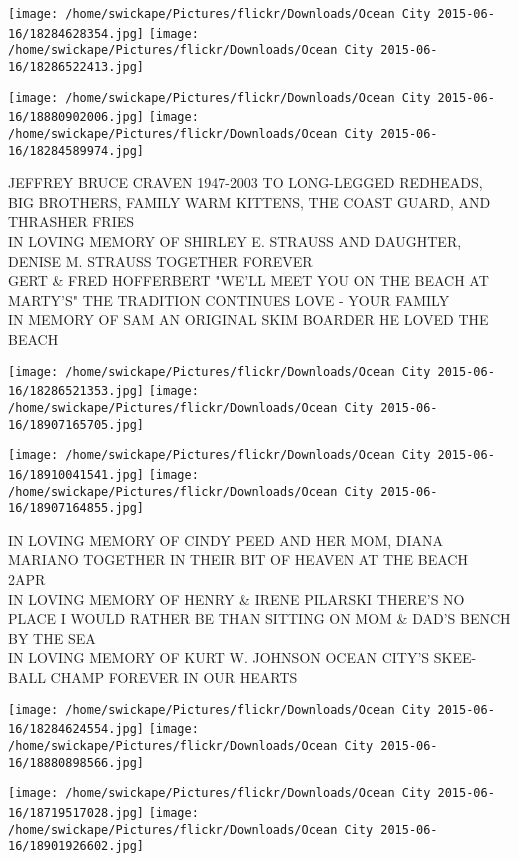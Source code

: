 \documentclass[10pt,letterpaper]{article}
\begin{document}
\texttt{[image: /home/swickape/Pictures/flickr/Downloads/Ocean City 2015-06-16/18284628354.jpg]}
\texttt{[image: /home/swickape/Pictures/flickr/Downloads/Ocean City 2015-06-16/18286522413.jpg]}

\texttt{[image: /home/swickape/Pictures/flickr/Downloads/Ocean City 2015-06-16/18880902006.jpg]}
\texttt{[image: /home/swickape/Pictures/flickr/Downloads/Ocean City 2015-06-16/18284589974.jpg]}

JEFFREY BRUCE CRAVEN 1947{-}2003 TO LONG{-}LEGGED REDHEADS, BIG BROTHERS, FAMILY WARM KITTENS, THE COAST GUARD, AND THRASHER FRIES\\
IN LOVING MEMORY OF SHIRLEY E. STRAUSS AND DAUGHTER, DENISE M. STRAUSS TOGETHER FOREVER\\
GERT \& FRED HOFFERBERT "WE'LL MEET YOU ON THE BEACH AT MARTY'S" THE TRADITION CONTINUES LOVE {-} YOUR FAMILY\\
IN MEMORY OF SAM AN ORIGINAL SKIM BOARDER HE LOVED THE BEACH
\pagebreak

\texttt{[image: /home/swickape/Pictures/flickr/Downloads/Ocean City 2015-06-16/18286521353.jpg]}
\texttt{[image: /home/swickape/Pictures/flickr/Downloads/Ocean City 2015-06-16/18907165705.jpg]}

\texttt{[image: /home/swickape/Pictures/flickr/Downloads/Ocean City 2015-06-16/18910041541.jpg]}
\texttt{[image: /home/swickape/Pictures/flickr/Downloads/Ocean City 2015-06-16/18907164855.jpg]}

IN LOVING MEMORY OF CINDY PEED AND HER MOM, DIANA MARIANO TOGETHER IN THEIR BIT OF HEAVEN AT THE BEACH\\
2APR\\
IN LOVING MEMORY OF HENRY \& IRENE PILARSKI THERE'S NO PLACE I WOULD RATHER BE THAN SITTING ON MOM \& DAD'S BENCH BY THE SEA\\
IN LOVING MEMORY OF KURT W. JOHNSON OCEAN CITY'S SKEE{-}BALL CHAMP FOREVER IN OUR HEARTS
\pagebreak

\texttt{[image: /home/swickape/Pictures/flickr/Downloads/Ocean City 2015-06-16/18284624554.jpg]}
\texttt{[image: /home/swickape/Pictures/flickr/Downloads/Ocean City 2015-06-16/18880898566.jpg]}

\texttt{[image: /home/swickape/Pictures/flickr/Downloads/Ocean City 2015-06-16/18719517028.jpg]}
\texttt{[image: /home/swickape/Pictures/flickr/Downloads/Ocean City 2015-06-16/18901926602.jpg]}
\end{document}
